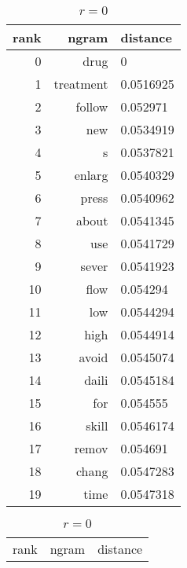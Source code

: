 \begin{table}[ht]
    \begin{subtable}[t]{.45\textwidth}
        \centering
        \begin{tabularx}{\textwidth}{r R l}
            \toprule
            rank & ngram & distance\\
            \midrule
            \num{0} & drug & \num{0}\\
            \num{1} & treatment & \num{0.0516925}\\
            \num{2} & follow & \num{0.052971}\\
            \num{3} & new & \num{0.0534919}\\
            \num{4} & s & \num{0.0537821}\\
            \num{5} & enlarg & \num{0.0540329}\\
            \num{6} & press & \num{0.0540962}\\
            \num{7} & about & \num{0.0541345}\\
            \num{8} & use & \num{0.0541729}\\
            \midrule
            \num{9} & sever & \num{0.0541923}\\
            \num{10} & flow & \num{0.054294}\\
            \num{11} & low & \num{0.0544294}\\
            \num{12} & high & \num{0.0544914}\\
            \num{13} & avoid & \num{0.0545074}\\
            \num{14} & daili & \num{0.0545184}\\
            \num{15} & for & \num{0.054555}\\
            \num{16} & skill & \num{0.0546174}\\
            \num{17} & remov & \num{0.054691}\\
            \num{18} & chang & \num{0.0547283}\\
            \num{19} & time & \num{0.0547318}\\
            \bottomrule
        \end{tabularx}
        \caption{$r = 0$}
        \label{tab:ranking_drug_r0}
    \end{subtable}
    \hfill
    \begin{subtable}[t]{.45\textwidth}
        \centering
        \begin{tabularx}{\textwidth}{r R l}
            \toprule
            rank & ngram & distance\\

\end{tabularx}
\end{subtable}
\end{table}
